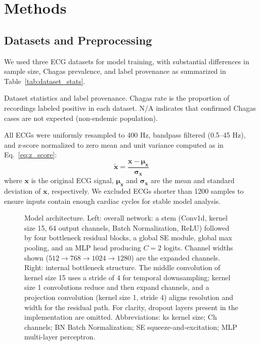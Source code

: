 \section{Methods}
\label{sec:methods}


\subsection{Datasets and Preprocessing}
\label{subsec:data}


We used three ECG datasets for model training, with substantial differences in sample size, Chagas prevalence, and label provenance as summarized in Table~\ref{tab:dataset_stats}.

\setlength{\tabcolsep}{4pt} %
\begin{table}[!htp]
\centering

\caption{Dataset statistics and label provenance. Chagas rate is the proportion of recordings labeled positive in each dataset. N/A indicates that confirmed Chagas cases are not expected (non-endemic population).}
\label{tab:dataset_stats}
\end{table}
\setlength{\tabcolsep}{6pt} %

All ECGs were uniformly resampled to 400 Hz, bandpass filtered (0.5–45 Hz), and z-score normalized to zero mean and unit variance computed as in Eq.~\ref{eq:z_score}:
\begin{equation}
\label{eq:z_score}
\tilde{\mathbf{x}} = \frac{\mathbf{x} - \boldsymbol{\mu}_{\mathbf{x}}}{\boldsymbol{\sigma}_{\mathbf{x}}}
\end{equation}
where $\mathbf{x}$ is the original ECG signal, $\boldsymbol{\mu}_{\mathbf{x}}$ and $\boldsymbol{\sigma}_{\mathbf{x}}$ are the mean and standard deviation of $\mathbf{x}$, respectively. We excluded ECGs shorter than 1200 samples to ensure inputs contain enough cardiac cycles for stable model analysis.


\begin{figure*}[!t]
\centering
{}
\caption{Model architecture. Left: overall network: a stem (Conv1d, kernel size 15, 64 output channels, Batch Normalization, ReLU) followed by four bottleneck residual blocks, a global SE module, global max pooling, and an MLP head producing $C = 2$ logits. Channel widths shown ($512 \to 768 \to 1024 \to 1280$) are the expanded channels.
Right: internal bottleneck structure. The middle convolution of kernel size 15 uses a stride of 4 for temporal downsampling; kernel size 1 convolutions reduce and then expand channels, and a projection convolution (kernel size 1, stride 4) aligns resolution and width for the residual path. For clarity, dropout layers present in the implementation are omitted. Abbreviations: ks kernel size; Ch channels; BN Batch Normalization; SE squeeze-and-excitation; MLP multi-layer perceptron.}
\label{fig:model}
\end{figure*}


